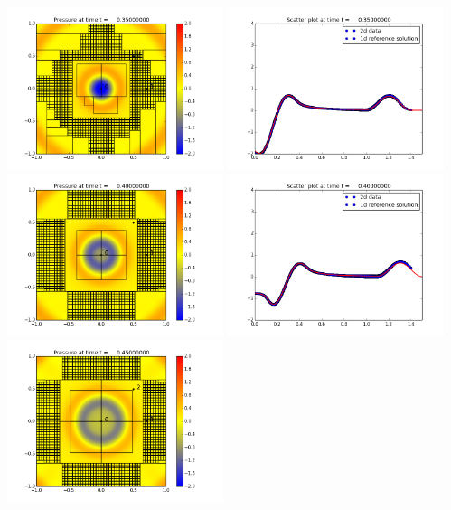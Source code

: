 \documentclass[11pt]{article}
\begin{document}
\vskip 10pt 
\includegraphics[width=0.475\textwidth]{frame0007fig0.png}
\includegraphics[width=0.475\textwidth]{frame0007fig3.png}
\vskip 10pt 
\includegraphics[width=0.475\textwidth]{frame0008fig0.png}
\includegraphics[width=0.475\textwidth]{frame0008fig3.png}
\vskip 10pt 
\includegraphics[width=0.475\textwidth]{frame0009fig0.png}
\end{document}
